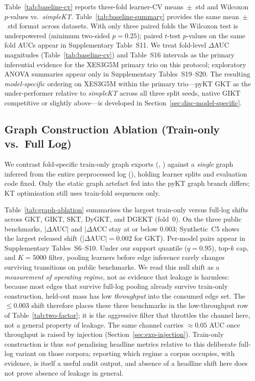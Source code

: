 \documentclass[pdflatex,sn-mathphys-num]{sn-jnl}
\begin{document}

Table~\ref{tab:baseline-cv} reports three-fold learner-CV means~$\pm$~std and
Wilcoxon $p$-values vs.\ \textit{simpleKT}. Table~\ref{tab:baseline-summary}
provides the same mean~$\pm$~std format across datasets. With only three paired
folds the Wilcoxon test is underpowered (minimum two-sided $p{=}0.25$); paired
$t$-test $p$-values on the same fold AUCs appear in Supplementary Table~S11.
We treat fold-level $\Delta$AUC magnitudes (Table~\ref{tab:baseline-cv}) and
Table~S16 intervals as the primary inferential evidence for the XES3G5M primary
trio on this protocol; exploratory ANOVA summaries appear only in Supplementary
Tables~S19--S20. The resulting \emph{model-specific} ordering on XES3G5M within
the primary trio---pyKT GKT as the under-performer relative to
\textit{simpleKT} across all three split seeds, native GIKT competitive or
slightly above---is developed in Section~\ref{sec:disc-model-specific}.

\subsection{Graph Construction Ablation (Train-only vs.\ Full Log)}
\label{sec:exp-graph-ablation}
We contrast fold-specific train-only graph exports
(, ) against a
\emph{single} graph inferred from the entire preprocessed log
(), holding learner splits and
evaluation code fixed. Only the static graph artefact fed into the pyKT graph
branch differs; KT optimisation still uses train-fold sequences only.


Table~\ref{tab:graph-ablation} summarises the largest train-only versus
full-log shifts across GKT, GIKT, SKT, DyGKT, and DGEKT (fold~0).
On the three public benchmarks, $|\Delta$AUC| and $|\Delta$ACC stay at
or below $0.003$; Synthetic~C5 shows the largest released shift
($|\Delta\text{AUC}|{=}0.002$ for GKT). Per-model pairs appear in
Supplementary Tables~S6--S10. Under our support quantile ($q{=}0.95$),
top-$k$ cap, and $K{=}5000$ filter, pooling learners before edge inference
rarely changes surviving transitions on public benchmarks. We read this null
shift as a \emph{measurement of operating regime}, not as evidence that
leakage is harmless: because most edges that survive full-log pooling already
survive train-only construction, held-out mass has low \emph{throughput} into
the consumed edge set. The ${\leq}0.003$ shift therefore places these three
benchmarks in the low-throughput row of Table~\ref{tab:two-factor}; it is the
aggressive filter that throttles the channel here, not a general property of
leakage. The same channel carries ${\approx}0.05$ AUC once throughput is raised
by injection (Section~\ref{sec:exp-injection}). Train-only construction is
thus \emph{not} penalising headline metrics relative to this deliberate
full-log variant on those corpora; reporting which regime a corpus occupies,
with evidence, is itself a useful audit output, and absence of a headline
shift here does not prove absence of leakage in general.
\end{document}
